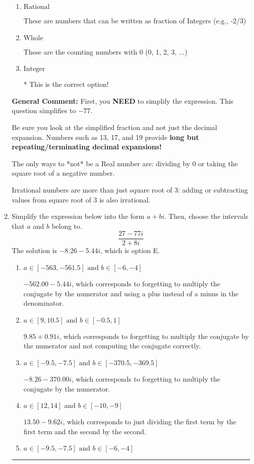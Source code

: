 \documentclass{extbook}[14pt]
\newcommand{\litem}[1]{\item #1

\rule{\textwidth}{0.4pt}}
\begin{document}
\begin{enumerate}
{\begin{enumerate}[label=\Alph*.]
These cannot be written as a fraction of Integers.
\item \( \text{Rational} \)

These are numbers that can be written as fraction of Integers (e.g., -2/3)
\item \( \text{Whole} \)

These are the counting numbers with 0 (0, 1, 2, 3, ...)
\item \( \text{Integer} \)

* This is the correct option!
\end{enumerate}

\textbf{General Comment:} First, you \textbf{NEED} to simplify the expression. This question simplifies to $-77$. 
 
 Be sure you look at the simplified fraction and not just the decimal expansion. Numbers such as 13, 17, and 19 provide \textbf{long but repeating/terminating decimal expansions!} 
 
 The only ways to *not* be a Real number are: dividing by 0 or taking the square root of a negative number. 
 
 Irrational numbers are more than just square root of 3: adding or subtracting values from square root of 3 is also irrational.
}
\litem{
Simplify the expression below into the form $a+bi$. Then, choose the intervals that $a$ and $b$ belong to.
\[ \frac{27 - 77 i}{2 + 8 i} \]
The solution is \( -8.26  - 5.44 i \), which is option E.\begin{enumerate}[label=\Alph*.]
\item \( a \in [-563, -561.5] \text{ and } b \in [-6, -4] \)

 $-562.00  - 5.44 i$, which corresponds to forgetting to multiply the conjugate by the numerator and using a plus instead of a minus in the denominator.
\item \( a \in [9, 10.5] \text{ and } b \in [-0.5, 1] \)

 $9.85  + 0.91 i$, which corresponds to forgetting to multiply the conjugate by the numerator and not computing the conjugate correctly.
\item \( a \in [-9.5, -7.5] \text{ and } b \in [-370.5, -369.5] \)

 $-8.26  - 370.00 i$, which corresponds to forgetting to multiply the conjugate by the numerator.
\item \( a \in [12, 14] \text{ and } b \in [-10, -9] \)

 $13.50  - 9.62 i$, which corresponds to just dividing the first term by the first term and the second by the second.
\item \( a \in [-9.5, -7.5] \text{ and } b \in [-6, -4] \)


\end{enumerate}}
\end{enumerate}
\end{document}
